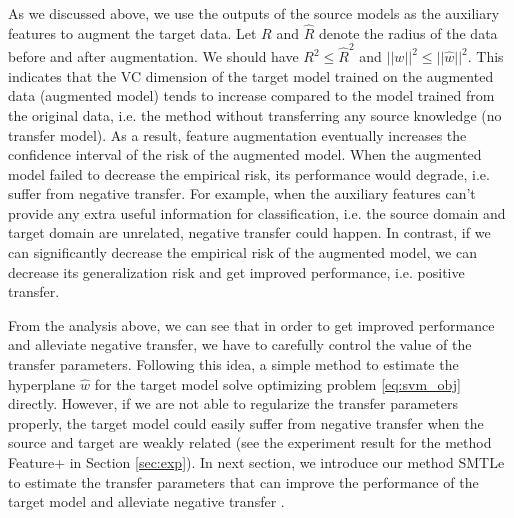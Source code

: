 As we discussed above, we use the outputs of the source models as the auxiliary features to augment the target data. Let $R$ and $\hat{R}$ denote the radius of the data before and after augmentation. We should have $R^2 \le \hat{R}^2$ and $||w||^2\le ||\hat{w}||^2$. This indicates that the VC dimension of the target model trained on the augmented data (augmented model) tends to increase compared to the model trained from the original data, i.e.  the method without transferring any source knowledge (no transfer model). As a result, feature augmentation eventually increases the confidence interval of the risk of the augmented model. When the augmented model failed to decrease the empirical risk, its performance would degrade, i.e. suffer from negative transfer. For example, when the auxiliary features can't provide any extra useful information for classification, i.e. the source domain and target domain are unrelated, negative transfer could happen. In contrast, if we can significantly decrease the empirical risk of the augmented model, we can decrease its generalization risk and get improved performance, i.e. positive transfer.

From the analysis above, we can see that in order to get improved performance and alleviate negative transfer, we have to carefully control the value of the transfer parameters. Following this idea, a simple method to estimate the hyperplane $\hat{w}$ for the target model solve optimizing problem \eqref{eq:svm_obj} directly. However, if we are not able to regularize the transfer parameters properly, the target model could easily suffer from negative transfer when the source and target are weakly related (see the experiment result for the method Feature+ in Section \ref{sec:exp}).
In next section, we introduce our method SMTLe to estimate the transfer parameters that can improve the performance of the target model and alleviate negative transfer .

